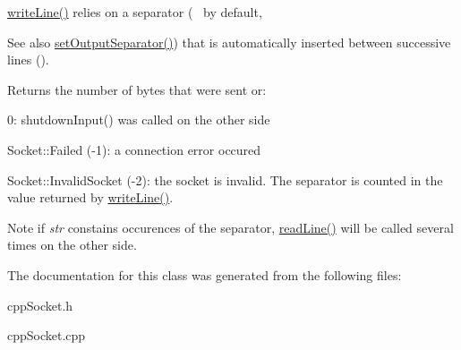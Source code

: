 \hyperlink{classcppu_1_1SocketBuffer_a92ae0351aaee8719d34e8c4618495d59}{write\+Line()} relies on a separator (~\newline
 by default, \begin{DoxySeeAlso}{See also}
\hyperlink{classcppu_1_1SocketBuffer_a0e5e6a9ce3bda28b65c559c8b3c91b0f}{set\+Output\+Separator()}) that is automatically inserted between successive lines ().
\end{DoxySeeAlso}
\begin{DoxyReturn}{Returns}
the number of bytes that were sent or\+:
\begin{DoxyItemize}
\item 0\+: shutdown\+Input() was called on the other side
\item Socket\+::\+Failed (-\/1)\+: a connection error occured
\item Socket\+::\+Invalid\+Socket (-\/2)\+: the socket is invalid. The separator is counted in the value returned by \hyperlink{classcppu_1_1SocketBuffer_a92ae0351aaee8719d34e8c4618495d59}{write\+Line()}.
\end{DoxyItemize}
\end{DoxyReturn}
\begin{DoxyNote}{Note}
if {\itshape str} constains occurences of the separator, \hyperlink{classcppu_1_1SocketBuffer_a222769d3776b9cbd3a727ee1f0e60358}{read\+Line()} will be called several times on the other side. 
\end{DoxyNote}


The documentation for this class was generated from the following files\+:\begin{DoxyCompactItemize}
\item 
cpp\+Socket.\+h\item 
cpp\+Socket.\+cpp\end{DoxyCompactItemize}

